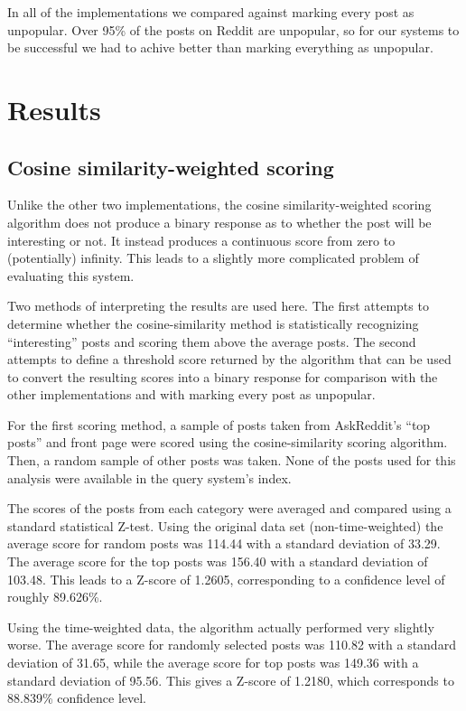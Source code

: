 \documentclass{acm_proc_article-sp}
\begin{document}
In all of the implementations we compared against marking every post as unpopular. Over 95\% of the posts on Reddit are unpopular, so for our systems to be successful we had to achive better than marking everything as unpopular. 

\section{Results}

\subsection{Cosine similarity-weighted scoring}

Unlike the other two implementations, the cosine similarity-weighted scoring algorithm does not produce a binary
response as to whether the post will be interesting or not.  It instead produces a continuous score from zero
to (potentially) infinity.  This leads to a slightly more complicated problem of evaluating this system.

Two methods of interpreting the results are used here.  The first attempts to determine whether the cosine-similarity method
is statistically recognizing ``interesting'' posts and scoring them above the average posts.  The second attempts to define
a threshold score returned by the algorithm that can be used to convert the resulting scores into a binary response for
comparison with the other implementations and with marking every post as unpopular.

For the first scoring method, a sample of posts taken from AskReddit's ``top posts'' and front page were scored using the
cosine-similarity scoring algorithm.  Then, a random sample of other posts was taken.  None of the posts used for this
analysis were available in the query system's index.

The scores of the posts from each category were averaged and compared using a standard statistical Z-test.  Using the
original data set (non-time-weighted) the average score for random posts was 114.44 with a standard deviation of 33.29.
The average score for the top posts was 156.40 with a standard deviation of 103.48.  This leads to a Z-score of
1.2605, corresponding to a confidence level of roughly 89.626\%.

Using the time-weighted data, the algorithm actually performed very slightly worse.  The average score for randomly
selected posts was 110.82 with a standard deviation of 31.65, while the average score for top posts was 149.36 with
a standard deviation of 95.56.  This gives a Z-score of 1.2180, which corresponds to 88.839\% confidence level.
\end{document}
